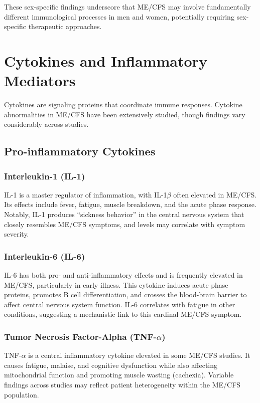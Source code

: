 These sex-specific findings underscore that ME/CFS may involve fundamentally different immunological processes in men and women, potentially requiring sex-specific therapeutic approaches.

\section{Cytokines and Inflammatory Mediators}
\label{sec:cytokines}

Cytokines are signaling proteins that coordinate immune responses. Cytokine abnormalities in ME/CFS have been extensively studied, though findings vary considerably across studies.

\subsection{Pro-inflammatory Cytokines}
\label{sec:pro-inflammatory}

\subsubsection{Interleukin-1 (IL-1)}

IL-1 is a master regulator of inflammation, with IL-1$\beta$ often elevated in ME/CFS. Its effects include fever, fatigue, muscle breakdown, and the acute phase response. Notably, IL-1 produces ``sickness behavior'' in the central nervous system that closely resembles ME/CFS symptoms, and levels may correlate with symptom severity.

\subsubsection{Interleukin-6 (IL-6)}

IL-6 has both pro- and anti-inflammatory effects and is frequently elevated in ME/CFS, particularly in early illness. This cytokine induces acute phase proteins, promotes B cell differentiation, and crosses the blood-brain barrier to affect central nervous system function. IL-6 correlates with fatigue in other conditions, suggesting a mechanistic link to this cardinal ME/CFS symptom.

\subsubsection{Tumor Necrosis Factor-Alpha (TNF-$\alpha$)}

TNF-$\alpha$ is a central inflammatory cytokine elevated in some ME/CFS studies. It causes fatigue, malaise, and cognitive dysfunction while also affecting mitochondrial function and promoting muscle wasting (cachexia). Variable findings across studies may reflect patient heterogeneity within the ME/CFS population.

